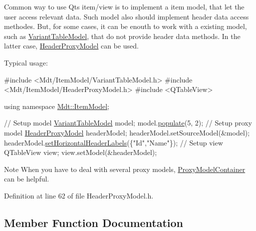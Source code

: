 Common way to use Qt\textquotesingle{}s item/view is to implement a item model, that let the user access relevant data. Such model also should implement header data access methodes. But, for some cases, it can be enouth to work with a existing model, such as \hyperlink{class_mdt_1_1_item_model_1_1_variant_table_model}{Variant\+Table\+Model}, that do not provide header data methods. In the latter case, \hyperlink{class_mdt_1_1_item_model_1_1_header_proxy_model}{Header\+Proxy\+Model} can be used.

Typical usage\+: 
\begin{DoxyCode}
\textcolor{preprocessor}{#include <Mdt/ItemModel/VariantTableModel.h>}
\textcolor{preprocessor}{#include <Mdt/ItemModel/HeaderProxyModel.h>}
\textcolor{preprocessor}{#include <QTableView>}

\textcolor{keyword}{using namespace }\hyperlink{namespace_mdt_1_1_item_model}{Mdt::ItemModel};

\textcolor{comment}{// Setup model}
\hyperlink{class_mdt_1_1_item_model_1_1_variant_table_model}{VariantTableModel} model;
model.\hyperlink{class_mdt_1_1_item_model_1_1_variant_table_model_af9db809e602bc61d218245c605e3473b}{populate}(5, 2);
\textcolor{comment}{// Setup proxy model}
\hyperlink{class_mdt_1_1_item_model_1_1_header_proxy_model}{HeaderProxyModel} headerModel;
headerModel.setSourceModel(&model);
headerModel.\hyperlink{class_mdt_1_1_item_model_1_1_header_proxy_model_a88a4b7d8a409e1c9f970482389942c1b}{setHorizontalHeaderLabels}(\{\textcolor{stringliteral}{"Id"},\textcolor{stringliteral}{"Name"}\});
\textcolor{comment}{// Setup view}
QTableView view;
view.setModel(&headerModel);
\end{DoxyCode}


\begin{DoxyNote}{Note}
When you have to deal with several proxy models, \hyperlink{class_mdt_1_1_item_model_1_1_proxy_model_container}{Proxy\+Model\+Container} can be helpful. 
\end{DoxyNote}


Definition at line 62 of file Header\+Proxy\+Model.\+h.



\subsection{Member Function Documentation}
